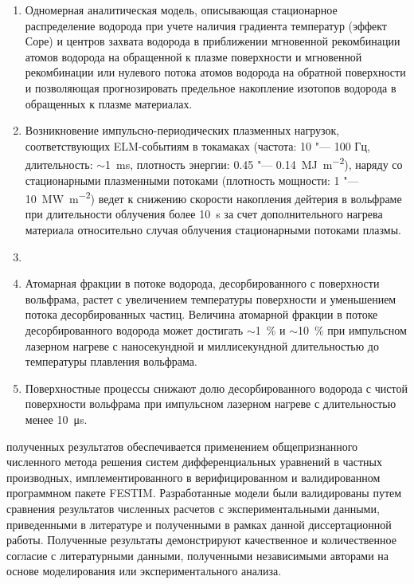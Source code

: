 {}
\begin{enumerate}[beginpenalty=10000] %
  \item Одномерная аналитическая модель, описывающая стационарное распределение водорода при учете наличия градиента температур (эффект Соре)
  и центров захвата водорода в приближении мгновенной рекомбинации атомов водорода на обращенной к плазме поверхности и мгновенной рекомбинации 
  или нулевого потока атомов водорода на обратной поверхности и позволяющая прогнозировать предельное накопление изотопов водорода в обращенных 
  к плазме материалах. 
  \item Возникновение импульсно-периодических плазменных нагрузок, соответствующих ELM-событиям в токамаках (частота: 10 "--- 100 Гц, 
  длительность: $\sim$\SI{1}{\milli\second}, плотность энергии: 0.45 "--- \SI{0.14}{\mega\joule\per\meter\squared}), наряду со стационарными плазменными потоками 
  (плотность мощности: 1 "--- \SI{10}{\mega\watt\per\meter\squared}) ведет к снижению скорости накопления дейтерия в 
  вольфраме при длительности облучения более \SI{10}{\second} за счет дополнительного нагрева материала относительно случая облучения стационарными потоками плазмы.
  \item {}
  \item Атомарная фракции в потоке водорода, десорбированного с поверхности вольфрама, растет с увеличением температуры поверхности и 
  уменьшением потока десорбированных частиц. Величина атомарной фракции в потоке десорбированного водорода может достигать $\sim$1~\% и $\sim$10~\% 
  при импульсном лазерном нагреве с наносекундной и миллисекундной длительностью до температуры плавления вольфрама.
  \item Поверхностные процессы снижают долю десорбированного водорода с чистой поверхности вольфрама при импульсном лазерном нагреве с длительностью 
  менее \SI{10}{\micro\second}.
\end{enumerate}

{\reliability} полученных результатов обеспечивается применением общепризнанного численного метода решения систем дифференциальных уравнений в 
частных производных, имплементированного в верифицированном и валидированном программном пакете FESTIM. Разработанные модели были валидированы путем 
сравнения результатов численных расчетов с экспериментальными данными, приведенными в литературе и полученными в рамках
данной диссертационной работы. Полученные результаты демонстрируют качественное и количественное согласие с 
литературными данными, полученными независимыми авторами на основе моделирования или экспериментального анализа.

